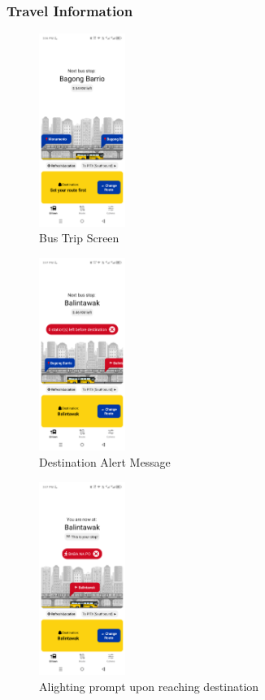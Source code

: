 \documentclass[journal]{./IEEE/IEEEtran}
\begin{document}
\subsubsection{\textbf{Travel Information}}

\begin{figure}[htbp]
  \centering
  \includegraphics[width=0.25\textwidth]{ICS-template/screenshots/EDSAan_trip.png}
  \caption{Bus Trip Screen}
  \label{fig:yourlabel}
\end{figure}

\begin{figure}[htbp]
  \centering
  \includegraphics[width=0.25\textwidth]{ICS-template/screenshots/EDSAan_alertbefore.png}
  \caption{Destination Alert Message}
  \label{fig:yourlabel}
\end{figure}

\begin{figure}[htbp]
  \centering
  \includegraphics[width=0.25\textwidth]{ICS-template/screenshots/EDSAan_baba.png}
  \caption{Alighting prompt upon reaching destination}
  \label{fig:yourlabel}
\end{figure}
\end{document}
